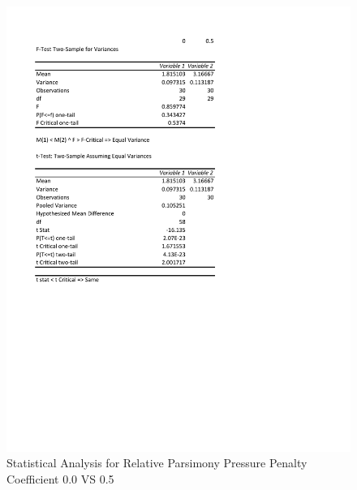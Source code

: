 \documentclass[times]{article}
\begin{document}
	\begin{figure}
		\caption{Statistical Analysis for Relative Parsimony Pressure Penalty Coefficient 0.0 VS 0.5}
		\label{fig:stat_rel_01}
		\includegraphics[width=\textwidth]{./pictures/relative_01.pdf}
	\end{figure}
\end{document}
